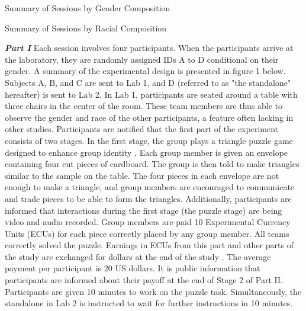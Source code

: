 \begin{table}[H]
 \captionsetup{justification=raggedright,singlelinecheck=false}
\caption{Summary of Sessions by Gender Composition} \label{tab:table1}
\centering

\end{table}

 

\begin{table}[H]
 \captionsetup{justification=raggedright,singlelinecheck=false}
\caption{Summary of Sessions by Racial Composition} \label{tab:table2}
\centering

\end{table}

\noindent \textbf{ \textit{Part I}} 
 \newline
Each session involves four participants. When the participants arrive at the laboratory, they are randomly assigned IDs A to D conditional on their gender. A summary of the experimental design is presented in figure 1 below.  Subjects A, B, and C are sent to Lab 1, and D (referred to as "the standalone" hereafter) is sent to Lab 2. In Lab 1, participants are seated around a table with three chairs in the center of the room.  These team members are thus able to observe the gender and race of the other participants, a feature often lacking in other studies.  Participants are notified that the first part of the experiment consists of two stages. In the first stage, the group plays a triangle puzzle game designed to enhance group identity \citep{eg05}. Each group member is given an envelope containing four cut pieces of cardboard. The group is then told to make triangles similar to the sample on the table. The four pieces in each envelope are not enough to make a triangle, and group members are encouraged to communicate and trade pieces to be able to form the triangles. Additionally, participants are informed that interactions during the first stage (the puzzle stage) are being video and audio recorded. Group members are paid 10 Experimental Currency Units (ECUs) for each piece correctly placed by any group member. All teams correctly solved the puzzle. Earnings in ECUs from this part and other parts of the study are exchanged for dollars at the end of the study . The average payment per participant is 20 US dollars. It is public information that participants are informed about their payoff at the end of Stage 2 of Part II. Participants are given 10 minutes to work on the puzzle task. Simultaneously, the standalone in Lab 2 is instructed to wait for further instructions in 10 minutes. 

